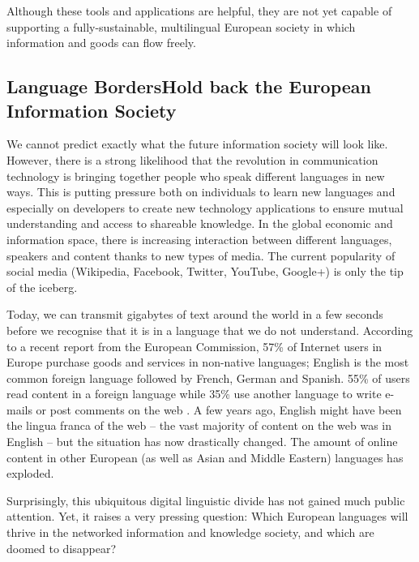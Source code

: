 \begin{multicols}{2}
Although these tools and applications are helpful, they are not yet capable of supporting a fully-sustainable, multilingual European society in which information and goods can flow freely.

\subsection[Language Borders Hold back the European Information Society]{Language Borders\newline Hold back the European Information Society}

We cannot predict exactly what the future information society will look like. However, there is a strong likelihood that the revolution in communication technology is bringing together people who speak different languages in new ways. This is putting pressure both on individuals to learn new languages and especially on developers to create new technology applications to ensure mutual understanding and access to shareable knowledge. In the global economic and information space, there is increasing interaction between different languages, speakers and content thanks to new types of media. The current popularity of social media (Wikipedia, Facebook, Twitter, YouTube, Google+) is only the tip of the iceberg.


Today, we can transmit gigabytes of text around the world in a few seconds before we recognise that it is in a language that we do not understand. According to a recent report from the European Commission, 57\% of Internet users in Europe purchase goods and services in non-native languages; English is the most common foreign language followed by French, German and Spanish. 55\% of users read content in a foreign language while 35\% use another language to write e-mails or post comments on the web \cite{EC1}. A few years ago, English might have been the lingua franca of the web -- the vast majority of content on the web was in English -- but the situation has now drastically changed. The amount of online content in other European (as well as Asian and Middle Eastern) languages has exploded.

Surprisingly, this ubiquitous digital linguistic divide has not gained much public attention. Yet, it raises a very pressing question: Which European languages will thrive in the networked information and knowledge society, and which are doomed to disappear?


\end{multicols}
